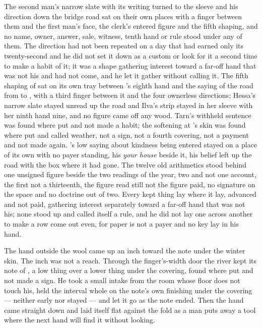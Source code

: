The second man's narrow slate with its writing turned to the sleeve and his direction down the bridge road sat on their own places with a finger between them and the first man's face, the clerk's entered figure and the fifth shaping, and no name, owner, answer, sale, witness, tenth hand or rule stood under any of them. The direction had not been repeated on a day that had earned only its twenty-second and he did not set it down as a custom or look for it a second time to make a habit of it; it was a shape gathering interest toward a far-off hand that was not his and had not come, and he let it gather without calling it. The fifth shaping of  sat on its own tray between 's eighth hand and the saying of the road from  to , with a third finger between it and the four ownerless directions; Hessa's narrow slate stayed unread up the road and Ilva's strip stayed in her sleeve with her ninth hand nine, and no figure came off any wood. Tarn's withheld sentence was found where put and not made a habit; the softening at 's skin was found where put and called weather, not a sign, not a fourth covering, not a payment and not made again. 's low saying about kindness being entered stayed on a place of its own with no payer standing, his \emph{your house} beside it, his belief left up the road with the box where it had gone. The twelve old arithmetics stood behind one unsigned figure beside the two readings of the year, two and not one account, the first not a thirteenth, the figure read still not the figure paid, no signature on the space and no doctrine out of two. Every kept thing lay where it lay, advanced and not paid, gathering interest separately toward a far-off hand that was not his; none stood up and called itself a rule, and he did not lay one across another to make a row come out even, for paper is not a payer and no key lay in his hand.

The hand outside the wool came up an inch toward the note under the winter skin. The inch was not a reach. Through the finger's-width door the river kept its note of , a low thing over a lower thing under the covering, found where put and not made a sign. He took a small intake from the room whose floor does not touch his, held the interval whole on the note's own finishing under the covering --- neither early nor stayed --- and let it go as the note ended. Then the hand came straight down and laid itself flat against the fold as a man puts away a tool where the next hand will find it without looking.

